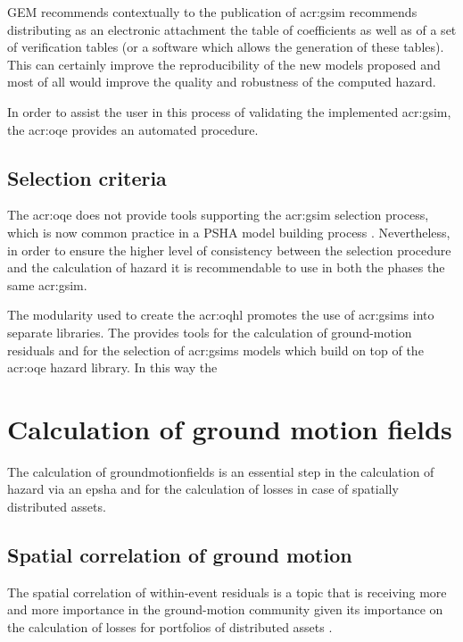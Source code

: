 GEM recommends contextually to the publication of \gls{acr:gsim} recommends
distributing as an electronic attachment the table of coefficients as well 
as of a set of verification tables (or a software which allows the generation 
of these tables). This can certainly improve the reproducibility of the 
new models proposed and most of all would improve the quality and 
robustness of the computed hazard.

In order to assist the user in this process of validating the implemented 
\gls{acr:gsim}, the \gls{acr:oqe} provides an automated procedure. 
%
\subsection{Selection criteria}
The \gls{acr:oqe} does not provide tools supporting the \gls{acr:gsim}
selection process, which is now common practice in a PSHA model building 
process \parencite[see for example][]{delavaud2012}. Nevertheless, in order 
to ensure the higher level of consistency between the selection procedure and
the calculation of hazard it is recommendable to use in both the phases the 
same \gls{acr:gsim}. 

The modularity used to create the {acr:oqhl} promotes the use of 
\glspl{acr:gsim} into separate libraries. The %
\parencite{weatherill2014} provides tools for the calculation of ground-motion
residuals and for the selection of \glspl{acr:gsim} models which build on top 
of the \gls{acr:oqe} hazard library. In this way the 
%
\section{Calculation of ground motion fields}
%
The calculation of \glspl{groundmotionfield} is an essential step in the
calculation of hazard via an \gls{epsha} and for the calculation of losses 
in case of spatially distributed assets.
\subsection{Spatial correlation of ground motion}
The spatial correlation of within-event residuals 
is a topic that is 
receiving more and more importance in the ground-motion community given 
its importance on the calculation of losses for portfolios of distributed 
assets \parencite{crowley2006}.
%
